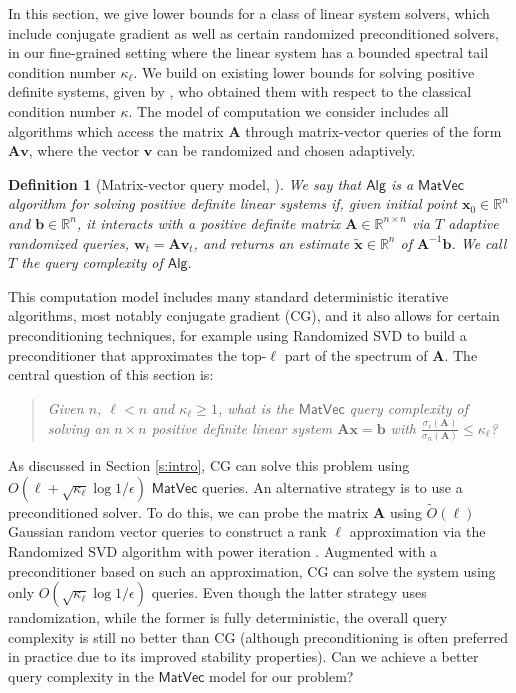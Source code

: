 \documentclass[11pt]{article}
\def\x{{\mathbf x}}
\def\w{{\mathbf w}}
\def\v{{\mathbf v}}
\def\Alg{{\mathsf{Alg}}}
\def\MatVec{{\mathsf{MatVec}}}
\def\b{{\mathbf b}}
\def\A{{\mathbf A}}
\def\R{{\mathbf R}}
\def\R{{\mathds R}}
\newtheorem{dfn}[thm]{Definition}
\begin{document}
In this section, we give lower bounds for a class of linear system solvers, which include conjugate gradient as well as certain randomized preconditioned solvers, in our fine-grained setting where the linear system has a bounded spectral tail condition number $\kappa_{\ell}$. We build on existing lower bounds for solving positive definite systems, given by \cite{braverman2020gradient}, who obtained them with respect to the classical condition number $\kappa$. The model of computation we consider includes all algorithms which access the matrix $\A$ through matrix-vector queries of the form $\A\v$, where the vector $\v$ can be randomized and chosen adaptively.

\begin{dfn}[Matrix-vector query model,  \cite{braverman2020gradient}]\label{d:matvec}
We say that $\Alg$ is a $\MatVec$ algorithm for solving positive definite linear systems if, given initial point $\x_0\in\R^n$ and $\b\in\R^n$, it interacts with a positive definite matrix $\A\in\R^{n\times n}$ via $T$ adaptive randomized queries, $\w_t=\A\v_t$, and returns an estimate $\tilde \x\in\R^n$ of $\A^{-1}\b$. We call $T$ the query complexity of $\Alg$.
\end{dfn}

This computation model includes many standard deterministic iterative algorithms, most notably conjugate gradient (CG), and it also allows for certain preconditioning techniques, for example using Randomized SVD to build a preconditioner that approximates the top-$\ell$ part of the spectrum of $\A$. The central question of this section is:
\begin{quote}
\emph{Given $n$, $\ell < n$ and $\kappa_\ell\geq 1$, what is the $\MatVec$ query complexity of solving an $n\times n$ positive definite linear system $\A\x=\b$ with $\frac{\sigma_{\ell}(\A)}{\sigma_n(\A)}\leq \kappa_\ell$?}
\end{quote}
As discussed in Section \ref{s:intro}, CG can solve this problem using $O(\ell+\sqrt{\kappa_\ell}\log1/\epsilon)$ $\MatVec$ queries. An alternative strategy is to use a preconditioned solver. To do this, we can probe the matrix $\A$ using $\tilde O(\ell)$ Gaussian random vector queries to construct a rank $\ell$ approximation via the Randomized SVD algorithm with power iteration \cite{halko2011finding}. Augmented with a preconditioner based on such an approximation, CG can solve the system using only $O(\sqrt{\kappa_\ell}\log1/\epsilon)$ queries. 
Even though the latter strategy uses randomization, while the former is fully deterministic, the overall query complexity is still no better than CG (although preconditioning is often preferred in practice due to its improved stability properties). Can we achieve a better query complexity in the $\MatVec$ model for our problem?
\end{document}
